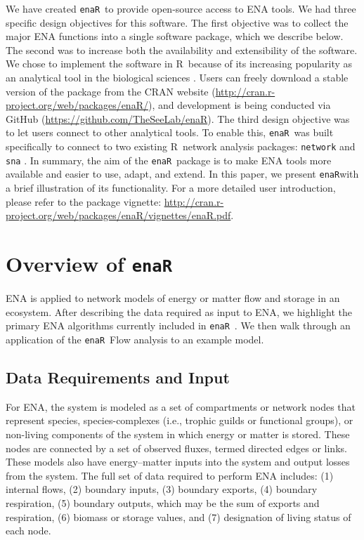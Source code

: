 \documentclass[11pt]{article}
\newcommand{\R}{R}
\newcommand{\enaR}{\texttt{enaR}}
\begin{document}
\begin{spacing}{2}
We have created \enaR\ to provide open-source access to ENA tools.  We
had three specific design objectives for this software.  The first
objective was to collect the major ENA functions into a single
software package, which we describe below.  The second was to increase
both the availability and extensibility of the software. We chose to
implement the software in \R\ because of its increasing popularity as
an analytical tool in the biological sciences
\citep[e.g.,][]{dixon2003vegan, metcalf2012, revell2012phytools}.
Users can freely download a stable version of the package from the
CRAN website (\url{http://cran.r-project.org/web/packages/enaR/}), and
development is being conducted via GitHub
(\url{https://github.com/TheSeeLab/enaR}).  The third design objective
was to let users connect to other analytical tools.  To enable this,
\enaR\ was built specifically to connect to two existing \R\ network
analysis packages:  \texttt{network} \citep{butts08_network} and
\texttt{sna} \citep{butts08_social}.  In summary, the aim of the
\enaR\ package is to make ENA tools more available and easier to use,
adapt, and extend.  In this paper, we present \enaR  with a brief
illustration of its functionality. For a more detailed user
introduction, please refer to the package vignette: \url{http://cran.r-project.org/web/packages/enaR/vignettes/enaR.pdf}.

\section{Overview of \enaR}
ENA is applied to network models of energy or matter flow and storage
in an ecosystem.  After describing the data required as input to ENA,
we highlight the primary ENA algorithms currently included in \enaR\ .
We then walk through an application of the \enaR\ Flow analysis to an example
model.

\subsection{Data Requirements and Input}
For ENA, the system is modeled as a set of compartments or network nodes that
represent species, species-complexes (i.e., trophic guilds or
functional groups), or non-living components of the system in which
energy or matter is stored.  These nodes are connected by a set of
observed fluxes, termed directed edges or links.  %
These models also have energy--matter inputs into the system
 and output losses from the system.
The full set of data required to perform ENA includes: (1) internal
flows, (2) boundary inputs, (3) boundary exports, (4) boundary
respiration, (5) boundary outputs, which may be the sum of exports and
respiration, (6) biomass or storage values, and (7) designation of
living status of each node.


\end{spacing}
\end{document}

